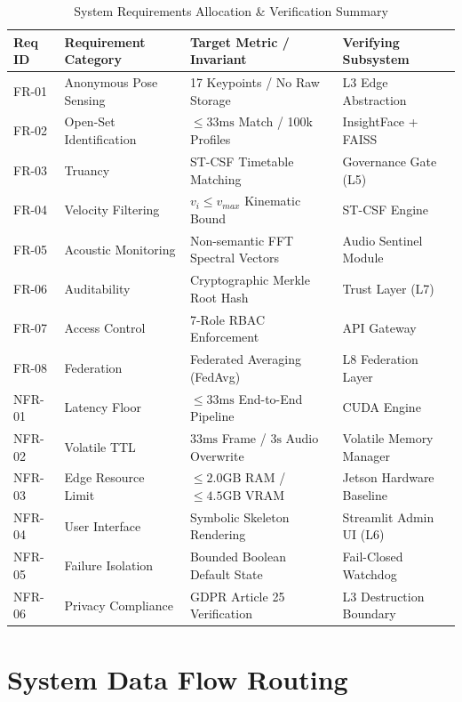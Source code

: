 \documentclass[12pt,a4paper,oneside]{report}
\begin{document}
\begin{table}[htbp]
\caption{System Requirements Allocation & Verification Summary}
\label{tab:requirements_matrix}
\centering
{}
\fontsize{10}{12}\selectfont
\begin{tabular}{@{}llll@{}}
\toprule
\textbf{Req ID} & \textbf{Requirement Category} & \textbf{Target Metric / Invariant} & \textbf{Verifying Subsystem} \\
\midrule
FR-01 & Anonymous Pose Sensing & 17 Keypoints / No Raw Storage & L3 Edge Abstraction \\
FR-02 & Open-Set Identification & $\le 33\text{ms}$ Match / 100k Profiles & InsightFace + FAISS \\
FR-03 & Truancy & ST-CSF Timetable Matching & Governance Gate (L5) \\
FR-04 & Velocity Filtering & $v_i \le v_{max}$ Kinematic Bound & ST-CSF Engine \\
FR-05 & Acoustic Monitoring & Non-semantic FFT Spectral Vectors & Audio Sentinel Module \\
FR-06 & Auditability & Cryptographic Merkle Root Hash & Trust Layer (L7) \\
FR-07 & Access Control & 7-Role RBAC Enforcement & API Gateway \\
FR-08 & Federation & Federated Averaging (FedAvg) & L8 Federation Layer \\
\midrule
NFR-01 & Latency Floor & $\le 33\text{ms}$ End-to-End Pipeline & CUDA Engine \\
NFR-02 & Volatile TTL & $33\text{ms}$ Frame / $3\text{s}$ Audio Overwrite & Volatile Memory Manager \\
NFR-03 & Edge Resource Limit & $\le 2.0\text{GB}$ RAM / $\le 4.5\text{GB}$ VRAM & Jetson Hardware Baseline \\
NFR-04 & User Interface & Symbolic Skeleton Rendering & Streamlit Admin UI (L6) \\
NFR-05 & Failure Isolation & Bounded Boolean Default State & Fail-Closed Watchdog \\
NFR-06 & Privacy Compliance & GDPR Article 25 Verification & L3 Destruction Boundary \\
\bottomrule
\end{tabular}
\end{table}

\section{System Data Flow Routing}
\end{document}

